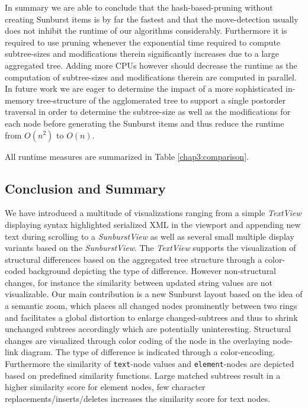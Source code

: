 In summary we are able to conclude that the hash-based-pruning without creating Sunburst items is by far the fastest and that the move-detection usually does not inhibit the runtime of our algorithms considerably. Furthermore it is required to use pruning whenever the exponential time required to compute subtree-sizes and modifications therein significantly increases due to a large aggregated tree. Adding more CPUs however should decrease the runtime as the computation of subtree-sizes and modifications therein are computed in parallel. In future work we are eager to determine the impact of a more sophisticated in-memory tree-structure of the agglomerated tree to support a single postorder traversal in order to determine the subtree-size as well as the modifications for each node before generating the Sunburst items and thus reduce the runtime from $O(n^2)$ to $O(n)$.

All runtime measures are summarized in Table \ref{chap3:comparison}.

\subsection{Conclusion and Summary}
We have introduced a multitude of visualizations ranging from a simple \emph{TextView} displaying syntax highlighted serialized XML in the viewport and appending new text during scrolling to a \emph{SunburstView} as well as several small multiple display variants based on the \emph{SunburstView}. The \emph{TextView} supports the visualization of structural differences based on the aggregated tree structure through a color-coded background depicting the type of difference. However non-structural changes, for instance the similarity between updated string values are not visualizable. Our main contribution is a new Sunburst layout based on the idea of a semantic zoom, which places all changed nodes prominently between two rings and facilitates a global distortion to enlarge changed-subtrees and thus to shrink unchanged subtrees accordingly which are potentially uninteresting. Structural changes are visualized through color coding of the node in the overlaying node-link diagram. The type of difference is indicated through a color-encoding. Furthermore the similarity of \texttt{text}-node values and \texttt{element}-nodes are depicted based on predefined similarity functions. Large matched subtrees result in a higher similarity score for element nodes, few character replacements/inserts/deletes increases the similarity score for text nodes.

